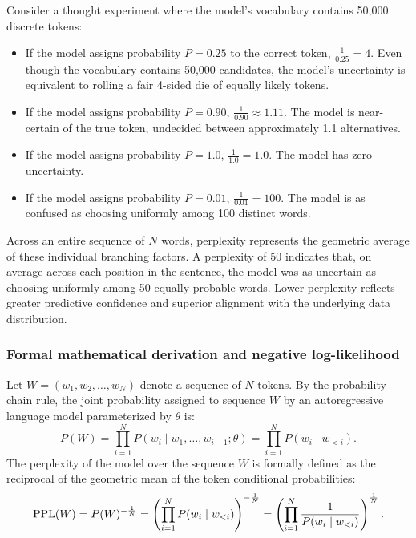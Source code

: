 \documentclass[../../main.tex]{subfiles}
\begin{document}
Consider a thought experiment where the model's vocabulary contains 50,000 discrete tokens:
\begin{itemize}
    \item If the model assigns probability $P = 0.25$ to the correct token, $\frac{1}{0.25} = 4$. Even though the vocabulary contains 50,000 candidates, the model's uncertainty is equivalent to rolling a fair 4-sided die of equally likely tokens.
    \item If the model assigns probability $P = 0.90$, $\frac{1}{0.90} \approx 1.11$. The model is near-certain of the true token, undecided between approximately 1.1 alternatives.
    \item If the model assigns probability $P = 1.0$, $\frac{1}{1.0} = 1.0$. The model has zero uncertainty.
    \item If the model assigns probability $P = 0.01$, $\frac{1}{0.01} = 100$. The model is as confused as choosing uniformly among 100 distinct words.
\end{itemize}
Across an entire sequence of $N$ words, perplexity represents the geometric average of these individual branching factors. A perplexity of 50 indicates that, on average across each position in the sentence, the model was as uncertain as choosing uniformly among 50 equally probable words. Lower perplexity reflects greater predictive confidence and superior alignment with the underlying data distribution.

\subsubsection{Formal mathematical derivation and negative log-likelihood}
Let $W = (w_1, w_2, \dots, w_N)$ denote a sequence of $N$ tokens. By the probability chain rule, the joint probability assigned to sequence $W$ by an autoregressive language model parameterized by $\theta$ is:
\begin{equation}
\label{eq:joint_prob_chain_rule}
P(W) = \prod_{i=1}^N P(w_i \mid w_1, \dots, w_{i-1}; \theta) = \prod_{i=1}^N P(w_i \mid w_{<i}).
\end{equation}
The perplexity of the model over the sequence $W$ is formally defined as the reciprocal of the geometric mean of the token conditional probabilities:
\begin{equation}
\label{eq:perplexity_def_geom}
\mathrm{PPL}(W) = P(W)^{-\frac{1}{N}} = \left( \prod_{i=1}^N P(w_i \mid w_{<i}) \right)^{-\frac{1}{N}} = \left( \prod_{i=1}^N \frac{1}{P(w_i \mid w_{<i})} \right)^{\frac{1}{N}}.
\end{equation}
\end{document}
